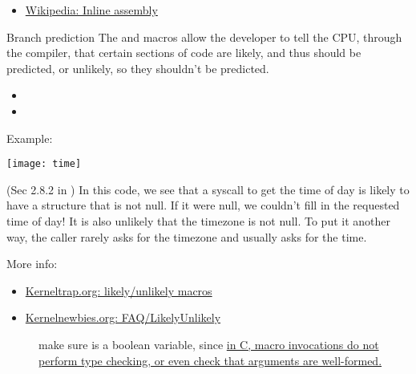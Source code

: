 \begin{itemize}
\item \href{http://en.wikipedia.org/wiki/Inline_assembly}{Wikipedia: Inline assembly}
\end{itemize}

\begin{frame}
  \begin{block}{Branch prediction}
    The  and  macros allow the developer to tell the CPU,
    through the compiler, that certain sections of code are likely, and thus should be
    predicted, or unlikely, so they shouldn't be predicted.
  \end{block}
  \begin{itemize}
  \item[] 
  \item[] 
  \end{itemize}
  \begin{block}{Example: }
    \begin{center}
      \texttt{[image: time]}
    \end{center}
  \end{block}
\end{frame}

(Sec 2.8.2 in \cite{rodriguez2005linux}) In this code, we see that a syscall to get the
time of day is likely to have a  structure that is not null. If it were
null, we couldn't fill in the requested time of day! It is also unlikely that the timezone
is not null. To put it another way, the caller rarely asks for the timezone and usually
asks for the time.

More info:
\begin{itemize}
\item \href{http://kerneltrap.org/node/4705}{Kerneltrap.org: likely/unlikely macros}
\item \href{http://kernelnewbies.org/FAQ/LikelyUnlikely}{Kernelnewbies.org: FAQ/LikelyUnlikely}
\end{itemize}

\begin{description}
\item[] make sure  is a boolean variable, since 
  \href{http://en.wikipedia.org/wiki/Inline_function#Comparison_with_macros}{in C, macro
    invocations do not perform type checking, or even check that arguments are
    well-formed.}
  
\end{description}

